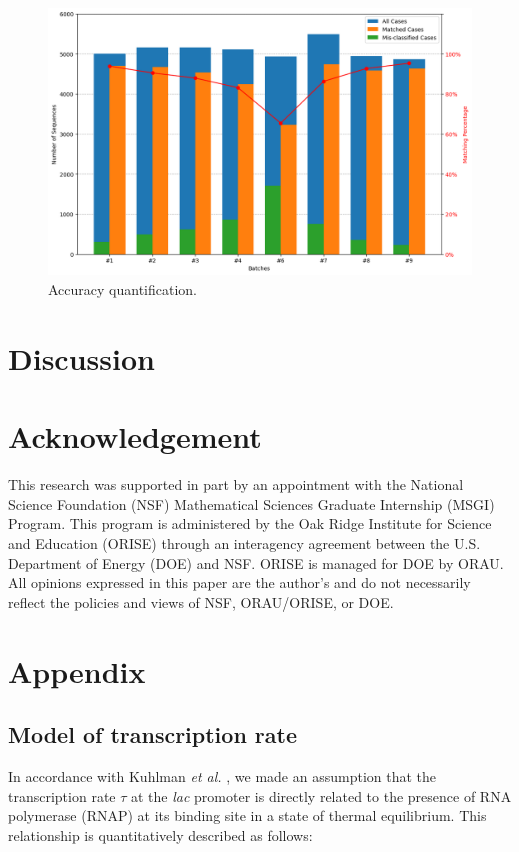 \documentclass{article}
\begin{document}
\begin{figure}[htbp]
\centering
\includegraphics[width=.8\linewidth]{figures/2300908_accuracy.png}
\caption{Accuracy quantification.}
\label{fig: accuracy}
\end{figure}


\section{Discussion}


\section{Acknowledgement}

This research was supported in part by an appointment with the National Science Foundation (NSF) Mathematical Sciences Graduate Internship (MSGI) Program. This program is administered by the Oak Ridge Institute for Science and Education (ORISE) through an interagency agreement between the U.S. Department of Energy (DOE) and NSF. ORISE is managed for DOE by ORAU. All opinions expressed in this paper are the author's and do not necessarily reflect the policies and views of NSF, ORAU/ORISE, or DOE.


\newpage
\printbibliography


\newpage
\section{Appendix}

\subsection{Model of transcription rate}\label{sup sec: tau model}

In accordance with Kuhlman \textit{et al.} \cite{Kuhlman2007PNAS}, we made an assumption that the transcription rate $\tau$ at the \textit{lac} promoter is directly related to the presence of RNA polymerase (RNAP) at its binding site in a state of thermal equilibrium. This relationship is quantitatively described as follows:
\end{document}
